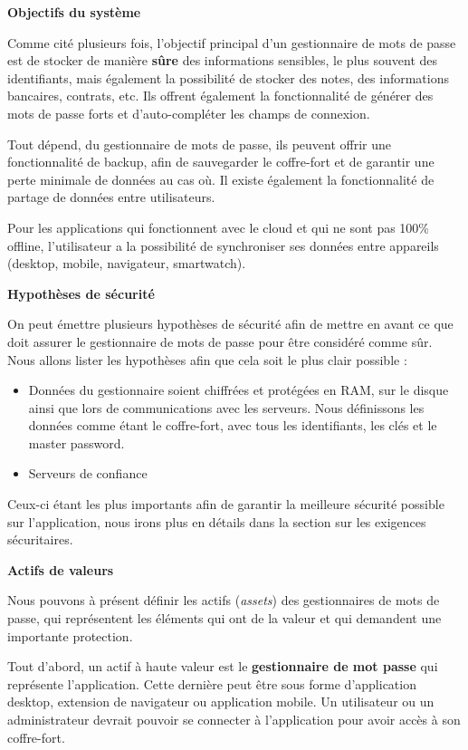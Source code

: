 \textbf{Objectifs du système}

Comme cité plusieurs fois, l'objectif principal d'un gestionnaire de mots de passe est de stocker de manière \textbf{sûre} des informations sensibles, le plus souvent des identifiants, mais également la possibilité de stocker des notes, des informations bancaires, contrats, etc. Ils offrent également la fonctionnalité de générer des mots de passe forts et d'auto-compléter les champs de connexion. 

Tout dépend, du gestionnaire de mots de passe, ils peuvent offrir une fonctionnalité de backup, afin de sauvegarder le coffre-fort et de garantir une perte minimale de données au cas où. Il existe également la fonctionnalité de partage de données entre utilisateurs.

Pour les applications qui fonctionnent avec le cloud et qui ne sont pas 100\% offline, l'utilisateur a la possibilité de synchroniser ses données entre appareils (desktop, mobile, navigateur, smartwatch). 

\textbf{Hypothèses de sécurité}

On peut émettre plusieurs hypothèses de sécurité afin de mettre en avant ce que doit assurer le gestionnaire de mots de passe pour être considéré comme sûr. Nous allons lister les hypothèses afin que cela soit le plus clair possible :

\begin{itemize}
	\item Données du gestionnaire soient chiffrées et protégées en RAM, sur le disque ainsi que lors de communications avec les serveurs. Nous définissons les données comme étant le coffre-fort, avec tous les identifiants, les clés et le master password. 
	\item Serveurs de confiance
\end{itemize}

Ceux-ci étant les plus importants afin de garantir la meilleure sécurité possible sur l'application, nous irons plus en détails dans la section sur les exigences sécuritaires.

\textbf{Actifs de valeurs}

Nous pouvons à présent définir les actifs (\textit{assets}) des gestionnaires de mots de passe, qui représentent les éléments qui ont de la valeur et qui demandent une importante protection. 

Tout d'abord, un actif à haute valeur est le \textbf{gestionnaire de mot passe} qui représente l'application. Cette dernière peut être sous forme d'application desktop, extension de navigateur ou application mobile. Un utilisateur ou un administrateur devrait pouvoir se connecter à l'application pour avoir accès à son coffre-fort.

